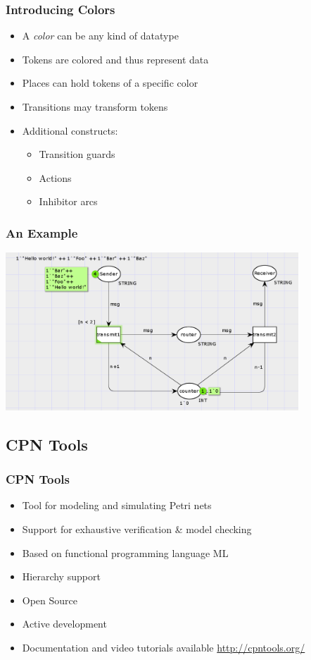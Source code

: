 \documentclass{beamer}
\newenvironment{myitemize}{\begin{itemize}\addtolength{\itemsep}{2mm}}{\end{itemize}}
\begin{document}
\begin{frame}
\frametitle{Introducing Colors}

\begin{myitemize}
  \item A \emph{color} can be any kind of datatype
  \item Tokens are colored and thus represent data
  \item Places can hold tokens of a specific color
  \item Transitions may transform tokens
  \item Additional constructs:
     \begin{myitemize}
        \item Transition guards
        \item Actions
        \item Inhibitor arcs
     \end{myitemize}
\end{myitemize}

\end{frame}

\begin{frame}
\frametitle{An Example}
\begin{center}
\includegraphics[width=11cm]{cpn_example.png}
\end{center}
\end{frame}

\subsection{CPN Tools}
\begin{frame}
\frametitle{CPN Tools}
\begin{myitemize}
  \item Tool for modeling and simulating Petri nets
  \item Support for exhaustive verification \& model checking
  \item Based on functional programming language ML
  \item Hierarchy support
  \item Open Source
  \item Active development
  \item Documentation and video tutorials available \url{http://cpntools.org/}
\end{myitemize}
\end{frame}
\end{document}

